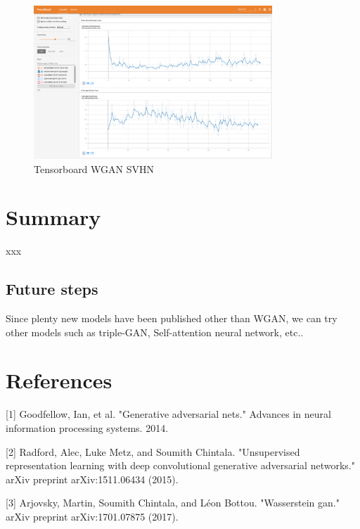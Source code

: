 \documentclass{article}
\begin{document}
\begin{figure}[!htb]
  \centering
  \includegraphics[width=0.8\textwidth]{tensorboard-WGAN-SVHN.png}
  \caption{Tensorboard WGAN SVHN}
  \label{fig:TB_WGAN_SVHN}
\end{figure}

\section{Summary}

xxx

\subsection{Future steps}

Since plenty new models have been published other than WGAN, we can try other models such as triple-GAN, Self-attention neural network, etc..

\section*{References}

[1] Goodfellow, Ian, et al. "Generative adversarial nets." Advances in neural information processing systems. 2014.

[2] Radford, Alec, Luke Metz, and Soumith Chintala. "Unsupervised representation learning with deep convolutional generative adversarial networks." arXiv preprint arXiv:1511.06434 (2015).

[3] Arjovsky, Martin, Soumith Chintala, and Léon Bottou. "Wasserstein gan." arXiv preprint arXiv:1701.07875 (2017).
\end{document}
